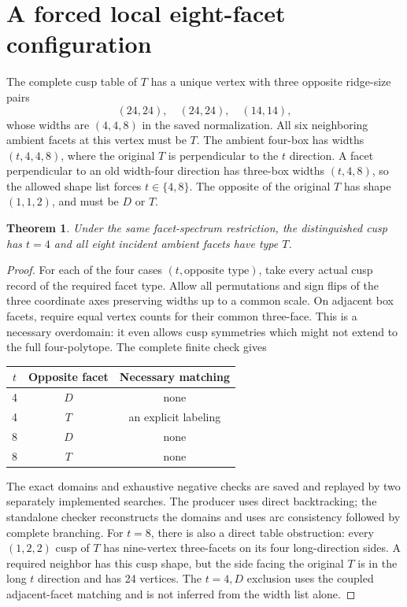 \documentclass[11pt]{article}
\newtheorem{theorem}{Theorem}
\begin{document}
\section{A forced local eight-facet configuration}
The complete cusp table of $T$ has a unique vertex with three opposite
ridge-size pairs
\[
 (24,24),\quad(24,24),\quad(14,14),
\]
whose widths are $(4,4,8)$ in the saved normalization. All six neighboring
ambient facets at this vertex must be $T$. The ambient four-box has
widths $(t,4,4,8)$, where the original $T$ is perpendicular to the
$t$ direction. A facet perpendicular to an old width-four direction
has three-box widths $(t,4,8)$, so the allowed shape list forces
$t\in\{4,8\}$. The opposite of the original $T$ has shape $(1,1,2)$,
and must be $D$ or $T$.

\begin{theorem}
Under the same facet-spectrum restriction, the distinguished cusp has
$t=4$ and all eight incident ambient facets have type $T$.
\end{theorem}
\begin{proof}
For each of the four cases $(t,\text{opposite type})$, take every actual
cusp record of the required facet type. Allow all permutations and sign
flips of the three coordinate axes preserving widths up to a common
scale. On adjacent box facets, require equal vertex counts for their
common three-face. This is a necessary overdomain: it even allows cusp
symmetries which might not extend to the full four-polytope.
The complete finite check gives
\begin{center}
\begin{tabular}{ccc}\toprule
$t$&Opposite facet&Necessary matching\\\midrule
4&$D$&none\\
4&$T$&an explicit labeling\\
8&$D$&none\\
8&$T$&none\\\bottomrule
\end{tabular}
\end{center}
The exact domains and exhaustive negative checks are saved and replayed
by two separately implemented searches. The producer uses direct
backtracking; the standalone checker reconstructs the domains and uses
arc consistency followed by complete branching.
For $t=8$, there is also a direct table obstruction: every $(1,2,2)$
cusp of $T$ has nine-vertex three-facets on its four long-direction
sides. A required neighbor has this cusp shape, but the side facing
the original $T$ is in the long $t$ direction and has 24 vertices.
The $t=4,D$ exclusion uses the coupled adjacent-facet matching and is
not inferred from the width list alone.
\end{proof}
\end{document}
